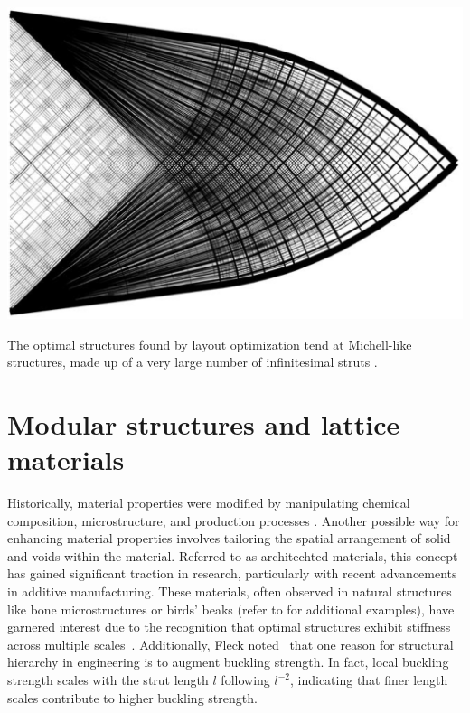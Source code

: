 \begin{marginfigure}
    \centering
    \includegraphics[width=\linewidth]{figures/02_literature/truss-ex.png}
    \caption{The optimal structures found by layout optimization tend at Michell-like structures, made up of a very large number of infinitesimal struts \cite{gilbert_layout_2003}.}
    \label{fig:02_truss-ex}
\end{marginfigure}

\section{Modular structures and lattice materials}
Historically, material properties were modified by manipulating chemical composition, microstructure, and production processes . Another possible way for enhancing material properties involves tailoring the spatial arrangement of solid and voids within the material. Referred to as architechted materials, this concept has gained significant traction in research, particularly with recent advancements in additive manufacturing. These materials, often observed in natural structures like bone microstructures or birds' beaks (refer to  for additional examples), have garnered interest due to the recognition that optimal structures exhibit stiffness across multiple scales~. Additionally, Fleck noted~ that one reason for structural hierarchy in engineering is to augment buckling strength. In fact, local buckling strength scales with the strut length $l$ following $l^{-2}$, indicating that finer length scales contribute to higher buckling strength.

